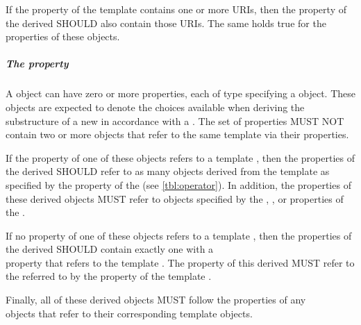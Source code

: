 If the  property of the template  contains one or more URIs, then the  property of the derived  SHOULD also contain those URIs. The same holds true for the  properties of these  objects.

\subparagraph{The  property}\label{sec:hasVariableComponent}

A  object can have zero or more  properties, each of type  specifying a  object. These  objects are expected to denote the choices available when deriving the substructure of a new  in accordance with a . The set of   properties MUST NOT contain two or more  objects that refer to the same template  via their  properties.

If the  property of one of these  objects refers to a template , then the  properties of the derived  SHOULD refer to as many  objects derived from the template  as specified by the  property of the  (see \ref{tbl:operator}). In addition, the  properties of these derived  objects MUST refer to  objects specified by the , , or  properties of the .

If no  property of one of these  objects refers to a template , then the  properties of the derived  SHOULD contain exactly one  with a \\  property that refers to the template . The  property of this derived  MUST refer to the  referred to by the  property of the template .

Finally, all of these derived  objects MUST follow the  properties of any \\
 objects that refer to their corresponding template  objects.

